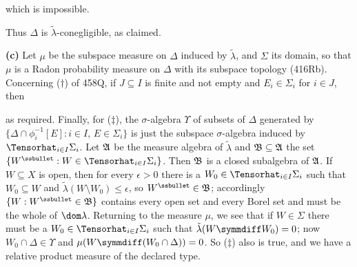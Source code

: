 {

\noindent which is impossible.\ \Bang

Thus $\Delta$ is $\tilde\lambda$-conegligible, as claimed.\ \Qed

\medskip

{\bf (c)} Let $\mu$ be the subspace measure on $\Delta$ induced by
$\tilde\lambda$, and $\Sigma$ its domain, so that $\mu$ is a Radon
probability measure on $\Delta$ with its subspace topology
(416Rb).   Concerning ($\dagger$) of 458Q, if $J\subseteq I$ is finite
and not empty and $E_i\in\Sigma_i$ for $i\in J$, then


\noindent as required.   Finally, for ($\ddagger$), the $\sigma$-algebra
$\Upsilon$ of subsets of $\Delta$ generated by
$\{\Delta\cap\phi_i^{-1}[E]:i\in I$, $E\in\Sigma_i\}$ is just the subspace
$\sigma$-algebra induced by $\Tensorhat_{i\in I}\Sigma_i$.   Let
$\frak A$ be the measure algebra of $\tilde\lambda$ and
$\frak B\subseteq\frak A$ the set
$\{W^{\ssbullet}:W\in\Tensorhat_{i\in I}\Sigma_i\}$.   Then $\frak B$ is
a closed subalgebra of $\frak A$.   If $W\subseteq X$ is open, then for
every $\epsilon>0$ there is a $W_0\in\Tensorhat_{i\in I}\Sigma_i$ such
that $W_0\subseteq W$ and $\tilde\lambda(W\setminus W_0)\le\epsilon$, so
$W^{\ssbullet}\in\frak B$;  accordingly $\{W:W^{\ssbullet}\in\frak B\}$
contains every open set and every Borel set and must be the whole of
$\dom\lambda$.   Returning to the measure $\mu$, we see that if
$W\in\Sigma$ there must be a $W_0\in\Tensorhat_{i\in I}\Sigma_i$ such
that $\tilde\lambda(W\symmdiff W_0)=0$;  now $W_0\cap\Delta\in\Upsilon$
and
$\mu(W\symmdiff(W_0\cap\Delta))=0$.    So ($\ddagger$) also is true, and
we have a relative product measure of the declared type.
}%


